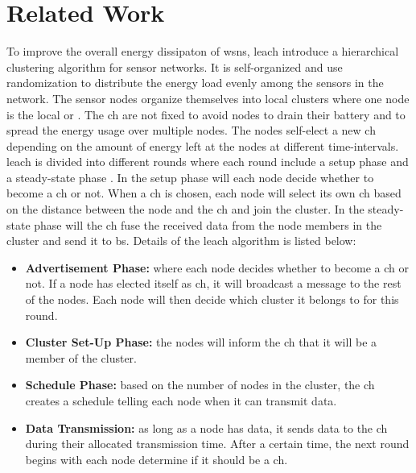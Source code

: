 \documentclass[USenglish]{uit-thesis}
\begin{document}
\chapter{Related Work} \label{chap:related_work}
To improve the overall energy dissipaton of \gls{wsn}s, \gls{leach} \cite{leach} introduce a hierarchical clustering algorithm for sensor networks. It is self-organized and use randomization to distribute the energy load evenly among the sensors in the network. The sensor nodes organize themselves into local clusters where one node is the local  or . The \gls{ch} are not fixed to avoid nodes to drain their battery and to spread the energy usage over multiple nodes. The nodes self-elect a new \gls{ch} depending on the amount of energy left at the nodes at different time-intervals. \gls{leach} is divided into different rounds where each round include a setup phase and a steady-state phase \cite{tree_based}. In the setup phase will each node decide whether to become a \gls{ch} or not. When a \gls{ch} is chosen, each node will select its own \gls{ch} based on the distance between the node and the \gls{ch} and join the cluster. In the steady-state phase will the \gls{ch} fuse the received data from the node members in the cluster and send it to \gls{bs}. Details of the \gls{leach} algorithm is listed below:

\begin{itemize}
\item \textbf{Advertisement Phase:} where each node decides whether to become a \gls{ch} or not. If a node has elected itself as \gls{ch}, it will broadcast a message to the rest of the nodes. Each node will then decide which cluster it belongs to for this round.
\item \textbf{Cluster Set-Up Phase:} the nodes will inform the \gls{ch} that it will be a member of the cluster.
\item \textbf{Schedule Phase:} based on the number of nodes in the cluster, the \gls{ch} creates a schedule telling each node when it can transmit data.
\item \textbf{Data Transmission:} as long as a node has data, it sends data to the \gls{ch} during their allocated transmission time. After a certain time, the next round begins with each node determine if it should be a \gls{ch}. 
\end{itemize}
\end{document}
